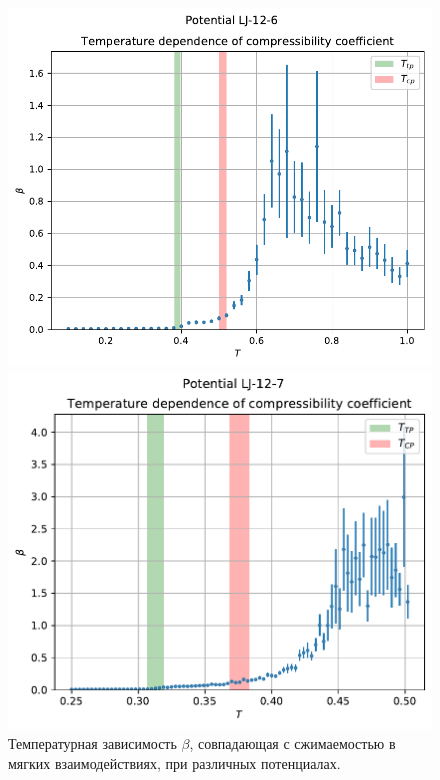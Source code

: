 \documentclass[pdf,hyperref={unicode}]{beamer}
\begin{document}
\begin{frame}
\begin{figure}[h]
\begin{center}
\begin{minipage}[h]{0.35\linewidth}
\includegraphics[width=\textwidth, keepaspectratio]{plot_compress_Potential LJ-12-6_1}
\end{minipage}
\begin{minipage}[h]{0.35\linewidth}
\includegraphics[width=\textwidth, keepaspectratio]{plot_compress_Potential LJ-12-7_1}
\end{minipage}
\caption{\tiny Температурная зависимость $\beta$, совпадающая с сжимаемостью в мягких взаимодействиях, при различных потенциалах.}
\label{risBeta}
\end{center}
\end{figure}

\end{frame}
\end{document}
